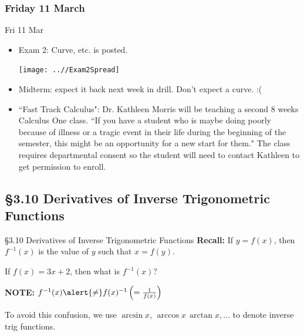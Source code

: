 \documentclass[cal1spr16Lectures.tex]{subfiles}
\begin{document}

\subsubsection{\bf Friday 11 March}

\begin{frame}[allowframebreaks]{Fri 11 Mar}
\begin{itemize}\footnotesize
\item Exam 2: Curve, etc. is posted. 

\begin{center}
\texttt{[image: ..//Exam2Spread]}
\end{center}
\framebreak
\item Midterm: expect it back next week in drill.  Don't expect a curve. :(
\item ``Fast Track Calculus": Dr. Kathleen Morris will be teaching a second 8 weeks Calculus One class.  ``If you have a student who is maybe doing poorly because of illness or a tragic event in their life during the beginning of the semester, this might be an opportunity for a new start for them."  The class requires departmental consent so the student will need to contact Kathleen to get permission to enroll.
\end{itemize}
\end{frame}

\subsection[3.10 Derivatives of Inverse Trigonometric Functions]{\S 3.10 Derivatives of Inverse Trigonometric Functions}

\begin{frame}{\S 3.10 Derivatives of Inverse Trigonometric Functions}{}\small
{\bf Recall:} If $y=f(x)$, then $f^{-1}(x)$ is the value of $y$ such that $x=f(y)$.
\begin{ex} If $f(x)=3x+2$, then what is $f^{-1}(x)$? \end{ex}
{\bf NOTE:}  $f^{-1}(x)\alert{\neq} f(x)^{-1}\textstyle\left(=\frac{1}{f(x)}\right)$

\vspace{0.5pc}
To avoid this confusion, we use $\arcsin{x},\,\arccos{x}\,\arctan{x},\dots$ to denote inverse trig functions.
\end{frame}
\end{document}
